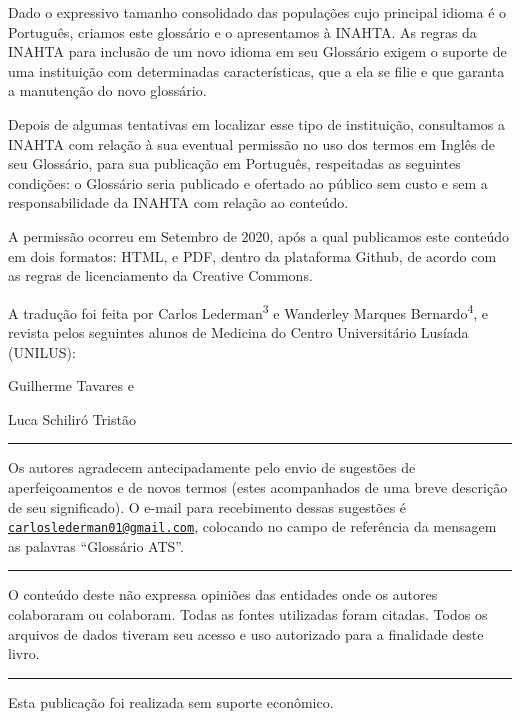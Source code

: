 \documentclass[
]{book}
\begin{document}
Dado o expressivo tamanho consolidado das populações cujo principal idioma é o Português, criamos este glossário e o apresentamos à INAHTA. As regras da INAHTA para inclusão de um novo idioma em seu Glossário exigem o suporte de uma instituição com determinadas características, que a ela se filie e que garanta a manutenção do novo glossário.

Depois de algumas tentativas em localizar esse tipo de instituição, consultamos a INAHTA com relação à sua eventual permissão no uso dos termos em Inglês de seu Glossário, para sua publicação em Português, respeitadas as seguintes condições: o Glossário seria publicado e ofertado ao público sem custo e sem a responsabilidade da INAHTA com relação ao conteúdo.

A permissão ocorreu em Setembro de 2020, após a qual publicamos este conteúdo em dois formatos: HTML, e PDF, dentro da plataforma Github, de acordo com as regras de licenciamento da Creative Commons.

A tradução foi feita por Carlos Lederman\textsuperscript{3} e Wanderley Marques Bernardo\textsuperscript{4}, e revista pelos seguintes alunos de Medicina do Centro Universitário Lusíada (UNILUS):

Guilherme Tavares e

Luca Schiliró Tristão

\begin{center}\rule{0.5\linewidth}{0.5pt}\end{center}

Os autores agradecem antecipadamente pelo envio de sugestões de aperfeiçoamentos e de novos termos (estes acompanhados de uma breve descrição de seu significado). O e-mail para recebimento dessas sugestões é \href{mailto:carloslederman01@gmail.com}{\nolinkurl{carloslederman01@gmail.com}}, colocando no campo de referência da mensagem as palavras ``Glossário ATS''.

\begin{center}\rule{0.5\linewidth}{0.5pt}\end{center}

O conteúdo deste não expressa opiniões das entidades onde os autores colaboraram ou colaboram. Todas as fontes utilizadas foram citadas. Todos os arquivos de dados tiveram seu acesso e uso autorizado para a finalidade deste livro.

\begin{center}\rule{0.5\linewidth}{0.5pt}\end{center}

Esta publicação foi realizada sem suporte econômico.
\end{document}
